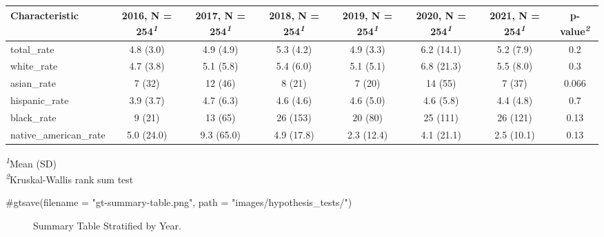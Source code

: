 \documentclass[
  letterpaper,
]{krantz}
\makeatletter
\newenvironment{Shaded}{\begin{snugshade}}{\end{snugshade}}
\newcommand{\CommentTok}[1]{\textcolor[rgb]{0.37,0.37,0.37}{#1}}
\newenvironment{kframe}{%
\medskip{}
\setlength{\fboxsep}{.8em}
 \def\at@end@of@kframe{}%
 \ifinner\ifhmode%
  \def\at@end@of@kframe{\end{minipage}}%
  \begin{minipage}{\columnwidth}%
 \fi\fi%
 \def\FrameCommand##1{\hskip\@totalleftmargin \hskip-\fboxsep
 \colorbox{shadecolor}{##1}\hskip-\fboxsep
     \hskip-\linewidth \hskip-\@totalleftmargin \hskip\columnwidth}%
 \MakeFramed {\advance\hsize-\width
   \@totalleftmargin\z@ \linewidth\hsize
   \@setminipage}}%
 {\par\unskip\endMakeFramed%
 \at@end@of@kframe}
\renewenvironment{Shaded}{\begin{kframe}}{\end{kframe}}
\makeatother
\begin{document}
\setlength{\LTpost}{0mm}
\begin{longtable*}{lccccccc}
\toprule
\textbf{Characteristic} & \textbf{2016}, N = 254\textsuperscript{\textit{1}} & \textbf{2017}, N = 254\textsuperscript{\textit{1}} & \textbf{2018}, N = 254\textsuperscript{\textit{1}} & \textbf{2019}, N = 254\textsuperscript{\textit{1}} & \textbf{2020}, N = 254\textsuperscript{\textit{1}} & \textbf{2021}, N = 254\textsuperscript{\textit{1}} & \textbf{p-value}\textsuperscript{\textit{2}} \\ 
\midrule
total\_rate & 4.8 (3.0) & 4.9 (4.9) & 5.3 (4.2) & 4.9 (3.3) & 6.2 (14.1) & 5.2 (7.9) & 0.2 \\ 
white\_rate & 4.7 (3.8) & 5.1 (5.8) & 5.4 (6.0) & 5.1 (5.1) & 6.8 (21.3) & 5.5 (8.0) & 0.3 \\ 
asian\_rate & 7 (32) & 12 (46) & 8 (21) & 7 (20) & 14 (55) & 7 (37) & 0.066 \\ 
hispanic\_rate & 3.9 (3.7) & 4.7 (6.3) & 4.6 (4.6) & 4.6 (5.0) & 4.6 (5.8) & 4.4 (4.8) & 0.7 \\ 
black\_rate & 9 (21) & 13 (65) & 26 (153) & 20 (80) & 25 (111) & 26 (121) & 0.13 \\ 
native\_american\_rate & 5.0 (24.0) & 9.3 (65.0) & 4.9 (17.8) & 2.3 (12.4) & 4.1 (21.1) & 2.5 (10.1) & 0.13 \\ 
\bottomrule
\end{longtable*}
\begin{minipage}{\linewidth}
\textsuperscript{\textit{1}}Mean (SD)\\
\textsuperscript{\textit{2}}Kruskal-Wallis rank sum test\\
\end{minipage}

\begin{Shaded}
\begin{Highlighting}[]
  \CommentTok{\#gtsave(filename = "gt{-}summary{-}table.png", path = "images/hypothesis\_tests/")}
\end{Highlighting}
\end{Shaded}

\begin{figure}


\caption{\label{fig-gt-summary-table}Summary Table Stratified by Year.}

\end{figure}%
\end{document}
